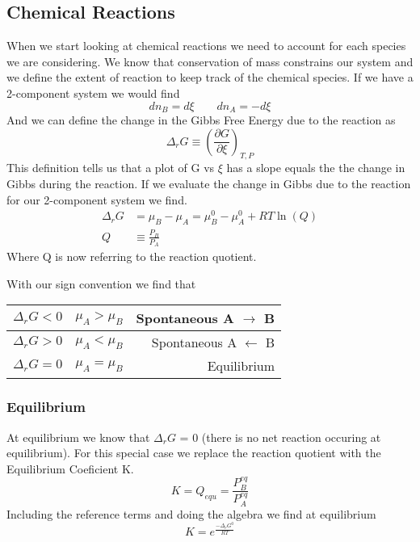 \documentclass{article}
\begin{document}
\subsection{Chemical Reactions}
When we start looking at chemical reactions we need to account for each species we are considering. 
We know that conservation of mass constrains our system and we define the extent of reaction to keep track of the chemical species. 
If we have a 2-component system we would find
\begin{equation}
dn_B = d\xi \qquad dn_A = -d\xi
\end{equation}
And we can define the change in the Gibbs Free Energy due to the reaction as 
\begin{equation}
\Delta_rG \equiv \left(\frac{\partial G}{\partial \xi}\right)_{T,P}
\end{equation}
This definition tells us that a plot of G vs $\xi$ has a slope equals the the change in Gibbs during the reaction. 
If we evaluate the change in Gibbs due to the reaction for our 2-component system we find. 
\begin{equation}
    \begin{split}
        \Delta_rG &= \mu_B - \mu_A = \mu_B^0 - \mu_A^0 + RT\ln\left(Q\right) \\
        Q &\equiv \frac{P_B}{P_A}
    \end{split}
\end{equation}
Where Q is now referring to the reaction quotient. 

With our sign convention we find that
\begin{center}
  \begin{tabular}{ | l | c | r |}
    \hline
    $\Delta_rG < 0$ & $\mu_A > \mu_B$ & Spontaneous A $\rightarrow$ B \\ \hline
     $\Delta_rG > 0$ & $\mu_A < \mu_B$ & Spontaneous A $\leftarrow$ B \\ \hline
     $\Delta_rG = 0$ & $\mu_A = \mu_B$ & Equilibrium \\
    \hline
  \end{tabular}
\end{center}

\subsubsection*{Equilibrium}
At equilibrium we know that $\Delta_rG$ = 0 (there is no net reaction occuring at equilibrium). 
For this special case we replace the reaction quotient with the Equilibrium Coeficient K. 
\begin{equation}
    K = Q_{equ} = \frac{P_B^{eq}}{P_A^{eq}}
\end{equation}
Including the reference terms and doing the algebra we find at equilibrium
\begin{equation}
        K = e^{\frac{-\Delta_rG^0}{RT}}
\end{equation}
\end{document}
